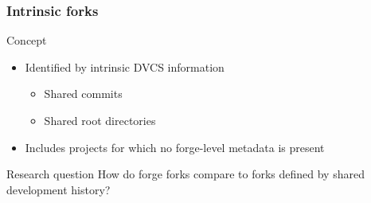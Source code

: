 \documentclass[aspectratio=169,xcolor=table]{beamer}
\begin{document}
    \begin{frame}
        \frametitle{Intrinsic forks}
        \begin{block}{Concept}
            \begin{center}
            \end{center}

            \begin{itemize}
                \item Identified by intrinsic DVCS information
                    \begin{itemize}
                        \item Shared commits
                        \item Shared root directories
                    \end{itemize}
                \item Includes projects for which no forge-level metadata is present
            \end{itemize}
        \end{block}

        \begin{block}{Research question}
            How do forge forks compare to forks defined by shared development
            history?
        \end{block}
    \end{frame}
\end{document}
